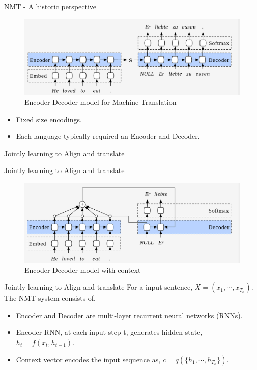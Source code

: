 ﻿\documentclass[table,aspectratio=43,mathserif,xcolor={usenames,dvipsnames,svgnames,table},10pt]{beamer}
\begin{document}
\begin{frame}{NMT - A historic perspective}
  \begin{figure}[h]
    \includegraphics[width=0.9\linewidth]{images/enc_dec.png}  
    \caption{Encoder-Decoder model for Machine Translation}
  \end{figure}
\begin{itemize}
 \item<+-> Fixed size encodings.
 \item<+-> Each language typically required an Encoder and Decoder.
\end{itemize}
\end{frame}

\begin{section}{Jointly learning to Align and translate}
\end{section}
\begin{frame}{Jointly learning to Align and translate}
\begin{figure}[h]
    \includegraphics[width=0.9\linewidth]{images/context.png}  
    \caption{Encoder-Decoder model with context}
  \end{figure}
\end{frame}

\begin{frame}{Jointly learning to Align and translate}
For a input sentence, $X = (x_1,\cdots, x_{T_{x}} )$. The NMT 
system consists of,
  \begin{itemize}
   \item<+-> Encoder and Decoder are multi-layer recurrent neural networks (RNNs).
   \item<+-> Encoder RNN, at each input step t, generates hidden state, $h_t = f(x_t, h_{t-1})$.
   \item<+-> Context vector encodes the input sequence as, $c = q(\{h_1,\cdots,h_{T_x}\})$.
  \end{itemize}
\end{frame}
\end{document}

